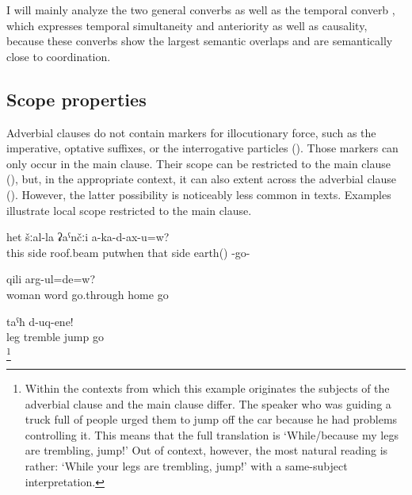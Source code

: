 I will mainly analyze the two general converbs as well as the temporal converb  , which expresses temporal simultaneity and anteriority as well as causality, because these converbs show the largest semantic overlaps and are semantically close to coordination.



\subsection{Scope properties}
\label{ssec:Scope properties}

Adverbial clauses do not contain markers for illocutionary force, such as the imperative, optative suffixes, or the interrogative particles (). Those markers can only occur in the main clause. Their scope can be restricted to the main clause (), but, in the appropriate context, it can also extent across the adverbial clause (). However, the latter possibility is noticeably less common in texts. Examples  illustrate local scope restricted to the main clause.
%
\begin{exe}
	\ex	\label{ex:When you put the roof beam at this (at one) side}
	\gll	[hej	šːal-li-cːe	cːiχːin	ka-b-alt-an=qːel]	het	šːal-la	ʡaˁnčːi	a-ka-d-ax-u=w?\\
		this	side	roof.beam	putwhen	that	side	earth()	-go-\\
	\glt	{}

	\ex	\label{ex:Do you go home because your wife told you to}
		qili	arg-ul=de=w?\\
			woman	word	go.through	home	go\\
	\glt	{}

	\ex	\label{ex:‎‎The legs are trembling, jump}
	\gll	[t'uˁ-me	rurčː-ul]	taˁħ	d-uq-ene!\\
		leg	tremble	jump	go\\
	\glt	{}\footnote{Within the contexts from which this example originates the subjects of the adverbial clause and the main clause differ. The speaker who was guiding a truck full of people urged them to jump off the car because he had problems controlling it. This means that the full translation is `While/because my legs are trembling, jump!’ Out of context, however, the most natural reading is rather: `While your legs are trembling, jump!’ with a same-subject interpretation.}
\end{exe}


